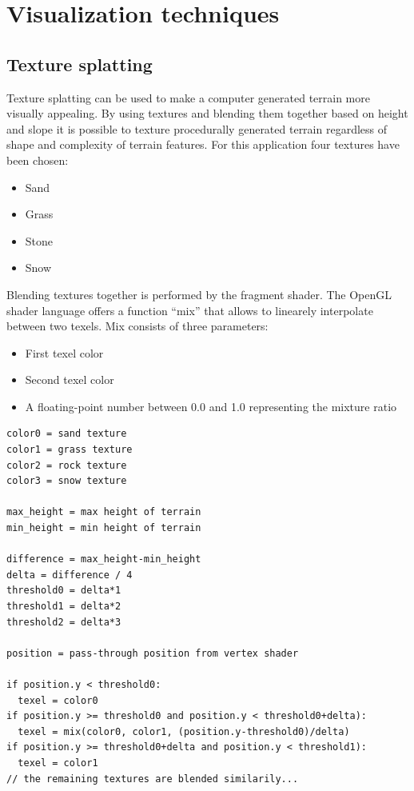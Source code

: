 \documentclass[11pt,a4paper,twoside,openright]{report}
\begin{document}
\section{Visualization techniques}
\subsection{Texture splatting}
Texture splatting can be used to make a computer generated terrain more visually appealing. By using textures and blending them together based on height and slope it is possible to texture procedurally generated terrain regardless of shape and complexity of terrain features. For this application four textures have been chosen:
\begin{itemize}
\item Sand
\item Grass
\item Stone
\item Snow
\end{itemize}
Blending textures together is performed by the fragment shader. The OpenGL shader language offers a function ``mix'' that allows to linearely interpolate between two texels. Mix consists of three parameters:
\begin{itemize}
\item First texel color
\item Second texel color
\item A floating-point number between 0.0 and 1.0 representing the mixture ratio
\end{itemize}
\begin{lstlisting}[caption=Fragment shader texture chooser pseudocode]
color0 = sand texture
color1 = grass texture
color2 = rock texture
color3 = snow texture

max_height = max height of terrain
min_height = min height of terrain

difference = max_height-min_height
delta = difference / 4
threshold0 = delta*1
threshold1 = delta*2
threshold2 = delta*3

position = pass-through position from vertex shader

if position.y < threshold0:
  texel = color0
if position.y >= threshold0 and position.y < threshold0+delta):
  texel = mix(color0, color1, (position.y-threshold0)/delta)
if position.y >= threshold0+delta and position.y < threshold1):
  texel = color1
// the remaining textures are blended similarily...
\end{lstlisting}
\end{document}
